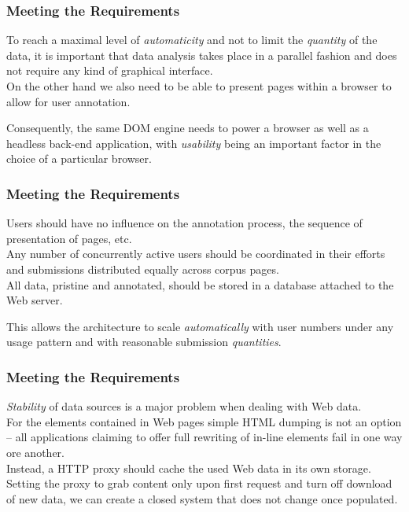 \documentclass{beamer}
\begin{document}
        \begin{frame}
            \frametitle{Meeting the Requirements}
            \begin{block}{}
                To reach a maximal level of \textit{automaticity} and not to limit the \textit{quantity} of the data, it is important that data analysis takes place in a parallel fashion and does not require any kind of graphical interface.\\
                On the other hand we also need to be able to present pages within a browser to allow for user annotation.

                \medskip
                Consequently, the same DOM engine needs to power a browser as well as a headless back-end application, with \textit{usability} being an important factor in the choice of a particular browser.
            \end{block}
        \end{frame}
        
        \begin{frame}
            \frametitle{Meeting the Requirements}
            \begin{block}{}
                Users should have no influence on the annotation process, the sequence of presentation of pages, etc. \\
                Any number of concurrently active users should be coordinated in their efforts and submissions distributed equally across corpus pages. \\
                All data, pristine and annotated, should be stored in a database attached to the Web server.

                \medskip
                This allows the architecture to scale \textit{automatically} with user numbers under any usage pattern and with reasonable submission \textit{quantities}.
            \end{block}
        \end{frame}

        \begin{frame}
            \frametitle{Meeting the Requirements}
            \begin{block}{}
                \textit{Stability} of data sources is a major problem when dealing with Web data. \\
                For the elements contained in Web pages simple HTML dumping is not an option -- all applications claiming to offer full rewriting of in-line elements fail in one way ore another. \\
                Instead, a HTTP proxy should cache the used Web data in its own storage. \\

                \medskip
                Setting the proxy to grab content only upon first request and turn off download of new data, we can create a closed system that does not change once populated.
            \end{block}
        \end{frame}
\end{document}
